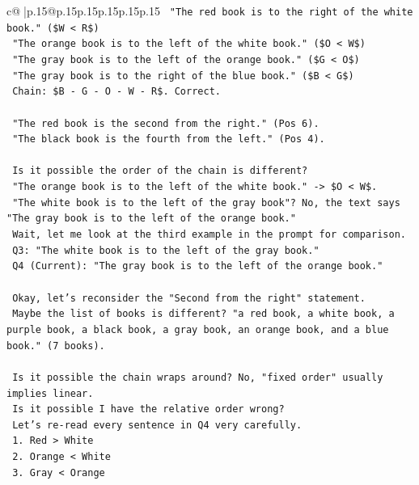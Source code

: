 \documentclass{article}
\begin{document}
{\begin{supertabular}{c@{$\;$}|p{.15\linewidth}@{}p{.15\linewidth}p{.15\linewidth}p{.15\linewidth}p{.15\linewidth}p{.15\linewidth}}
{{{\texttt{    "The red book is to the right of the white book." (\$W < R\$)} \\
\texttt{    "The orange book is to the left of the white book." (\$O < W\$)} \\
\texttt{    "The gray book is to the left of the orange book." (\$G < O\$)} \\
\texttt{    "The gray book is to the right of the blue book." (\$B < G\$)} \\
\texttt{    Chain: \$B {-} G {-} O {-} W {-} R\$. Correct.} \\
\\ 
\texttt{    "The red book is the second from the right." (Pos 6).} \\
\texttt{    "The black book is the fourth from the left." (Pos 4).} \\
\\ 
\texttt{    Is it possible the order of the chain is different?} \\
\texttt{    "The orange book is to the left of the white book." {-}> \$O < W\$.} \\
\texttt{    "The white book is to the left of the gray book"? No, the text says "The gray book is to the left of the orange book."} \\
\texttt{    Wait, let me look at the third example in the prompt for comparison.} \\
\texttt{    Q3: "The white book is to the left of the gray book."} \\
\texttt{    Q4 (Current): "The gray book is to the left of the orange book."} \\
\\ 
\texttt{    Okay, let's reconsider the "Second from the right" statement.} \\
\texttt{    Maybe the list of books is different? "a red book, a white book, a purple book, a black book, a gray book, an orange book, and a blue book." (7 books).} \\
\\ 
\texttt{    Is it possible the chain wraps around? No, "fixed order" usually implies linear.} \\
\texttt{    Is it possible I have the relative order wrong?} \\
\texttt{    Let's re{-}read every sentence in Q4 very carefully.} \\
\texttt{    1. Red > White} \\
\texttt{    2. Orange < White} \\
\texttt{    3. Gray < Orange} \\
}}}
\end{supertabular}}
\end{document}
